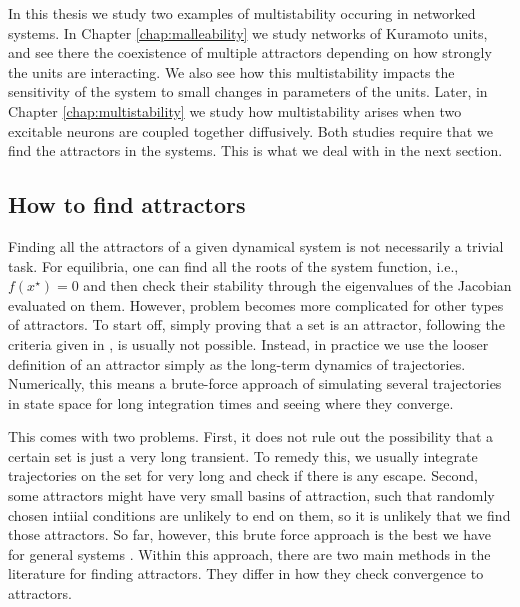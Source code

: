 In this thesis we study two examples of multistability occuring in networked systems. In Chapter \ref{chap:malleability} we study networks of Kuramoto units, and see there the coexistence of multiple attractors depending on how strongly the units are interacting. We also see how this multistability impacts the sensitivity of the system to small changes in parameters of the units. Later, in Chapter \ref{chap:multistability} we study how multistability arises when two excitable neurons are coupled together diffusively. Both studies require that we find the attractors in the systems. This is what we deal with in the next section.

\subsection{How to find attractors}\label{method:sec:finding-atts}
Finding all the attractors of a given dynamical system is not necessarily a trivial task. For equilibria, one can find all the roots of the system function, i.e., $f(x^\star) = 0$ and then check their stability through the eigenvalues of the Jacobian evaluated on them. However, problem becomes more complicated for other types of attractors.
To start off, simply proving that a set is an attractor, following the criteria given in , is usually not possible. Instead, in practice we use the looser definition of an attractor simply as the long-term dynamics of trajectories. Numerically, this means a brute-force approach of simulating several trajectories in state space for long integration times and seeing where they converge.

This comes with two problems. First, it does not rule out the possibility that a certain set is just a very long transient. To remedy this, we usually integrate trajectories on the set for very long and check if there is any escape. Second, some attractors might have very small basins of attraction, such that randomly chosen intiial conditions are unlikely to end on them, so it is unlikely that we find those attractors. So far, however, this brute force approach is the best we have for general systems \cite{}. Within this approach, there are two main methods in the literature for finding attractors. They differ in how they check convergence to attractors.

